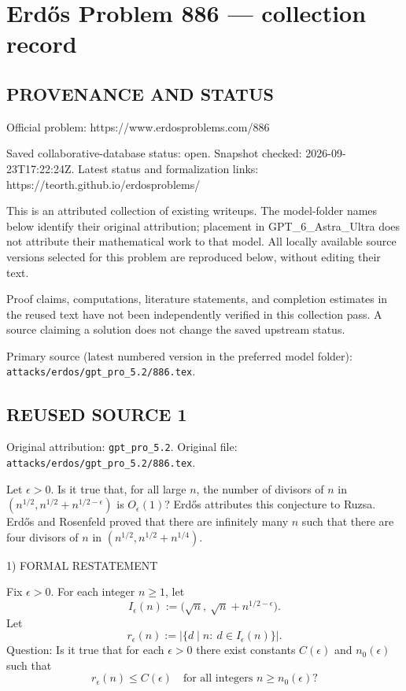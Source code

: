 \section*{Erd\H{o}s Problem 886 --- collection record}

\subsection*{PROVENANCE AND STATUS}
Official problem: https://www.erdosproblems.com/886

Saved collaborative-database status: open.
Snapshot checked: 2026-09-23T17:22:24Z.
Latest status and formalization links: https://teorth.github.io/erdosproblems/

This is an attributed collection of existing writeups. The model-folder names below identify their original attribution; placement in GPT\_6\_Astra\_Ultra does not attribute their mathematical work to that model. All locally available source versions selected for this problem are reproduced below, without editing their text.

Proof claims, computations, literature statements, and completion estimates in the reused text have not been independently verified in this collection pass. A source claiming a solution does not change the saved upstream status.

Primary source (latest numbered version in the preferred model folder): \texttt{attacks/erdos/gpt\_pro\_5.2/886.tex}.

\subsection*{REUSED SOURCE 1}
Original attribution: \texttt{gpt\_pro\_5.2}.
Original file: \texttt{attacks/erdos/gpt\_pro\_5.2/886.tex}.


Let $\epsilon>0$. Is it true that, for all large $n$, the number of divisors of $n$ in $(n^{1/2},n^{1/2}+n^{1/2-\epsilon})$ is $O_\epsilon(1)$? Erd\H{o}s attributes this conjecture to Ruzsa. Erd\H{o}s and Rosenfeld \cite{ErRo97} proved that there are infinitely many $n$ such that there are four divisors of $n$ in $(n^{1/2},n^{1/2}+n^{1/4})$.

1) FORMAL RESTATEMENT

Fix $\epsilon>0$. For each integer $n\ge 1$, let
\[I_{\epsilon}(n):=\big(\sqrt n,\ \sqrt n+n^{1/2-\epsilon}\big).
\]
Let
\[r_{\epsilon}(n):=\big|\{d\mid n:\ d\in I_{\epsilon}(n)\}\big|.
\]
Question: Is it true that for each $\epsilon>0$ there exist constants $C(\epsilon)$ and $n_0(\epsilon)$ such that
\[r_{\epsilon}(n)\le C(\epsilon)\quad\text{for all integers }n\ge n_0(\epsilon)?
\]

